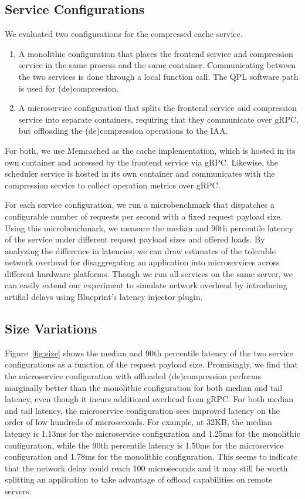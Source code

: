 \subsection{Service Configurations}
We evaluated two configurations for the compressed cache service.
\begin{enumerate}
  \item A monolithic configuration that places the frontend service and compression service in the same process and the same container. Communicating between the two services is done through a local function call. The QPL software path is used for (de)compression.
  \item A microservice configuration that splits the frontend service and compression service into separate containers, requiring that they communicate over gRPC, but offloading the (de)compression operations to the IAA.
\end{enumerate}
For both, we use Memcached as the cache implementation, which is hosted in its own container and accessed by the frontend service via gRPC. Likewise, the scheduler service is hosted in its own container and communicates with the compression service to collect operation metrics over gRPC.

For each service configuration, we run a microbenchmark that dispatches a configurable number of requests per second with a fixed request payload size. 
Using this microbenchmark, we measure the median and 90th percentile latency of the service under different request payload sizes and offered loads. 
By analyzing the difference in latencies, we can draw estimates of the tolerable network overhead for disaggregating an application into microservices across different hardware platforms. 
Though we run all services on the same server, we can easily extend our experiment to simulate network overhead by introducing artifial delays using Blueprint's latency injector plugin. 

\subsection{Size Variations}
Figure~\ref{fig:size} shows the median and 90th percentile latency of the two service configurations as a function of the request payload size. 
Promisingly, we find that the microservice configuration with offloaded (de)compression performs marginally better than the monolithic configuration for both median and tail latency, even though it incurs additional overhead from gRPC. 
For both median and tail latency, the microservice configuration sees improved latency on the order of low hundreds of microseconds.
For example, at 32KB, the median latency is 1.13ms for the microservice configuration and 1.25ms for the monolithic configuration, while the 90th percentile latency is 1.50ms for the microservice configuration and 1.78ms for the monolithic configuration. 
This seems to indicate that the network delay could reach 100 microseconds and it may still be worth splitting an application to take advantage of offload capabilities on remote servers.

